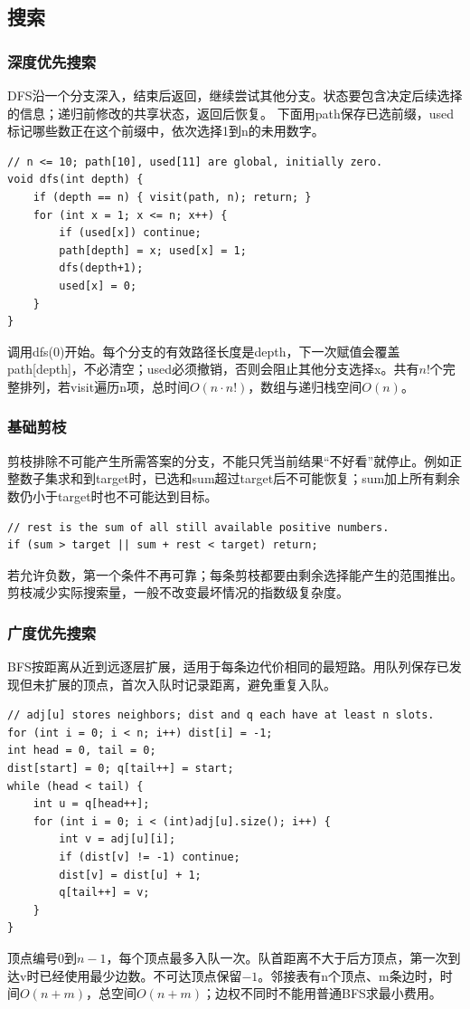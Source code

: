 \subsection{搜索}
\subsubsection{深度优先搜索}
DFS沿一个分支深入，结束后返回，继续尝试其他分支。状态要包含决定后续选择的信息；递归前修改的共享状态，返回后恢复。
下面用path保存已选前缀，used标记哪些数正在这个前缀中，依次选择1到n的未用数字。
\begin{lstlisting}
// n <= 10; path[10], used[11] are global, initially zero.
void dfs(int depth) {
    if (depth == n) { visit(path, n); return; }
    for (int x = 1; x <= n; x++) {
        if (used[x]) continue;
        path[depth] = x; used[x] = 1;
        dfs(depth+1);
        used[x] = 0;
    }
}
\end{lstlisting}
调用dfs(0)开始。每个分支的有效路径长度是depth，下一次赋值会覆盖path[depth]，不必清空；used必须撤销，否则会阻止其他分支选择x。共有$n!$个完整排列，若visit遍历n项，总时间$O(n\cdot n!)$，数组与递归栈空间$O(n)$。
\subsubsection{基础剪枝}
剪枝排除不可能产生所需答案的分支，不能只凭当前结果“不好看”就停止。例如正整数子集求和到target时，已选和sum超过target后不可能恢复；sum加上所有剩余数仍小于target时也不可能达到目标。
\begin{lstlisting}
// rest is the sum of all still available positive numbers.
if (sum > target || sum + rest < target) return;
\end{lstlisting}
若允许负数，第一个条件不再可靠；每条剪枝都要由剩余选择能产生的范围推出。剪枝减少实际搜索量，一般不改变最坏情况的指数级复杂度。
\subsubsection{广度优先搜索}
BFS按距离从近到远逐层扩展，适用于每条边代价相同的最短路。用队列保存已发现但未扩展的顶点，首次入队时记录距离，避免重复入队。
\begin{lstlisting}
// adj[u] stores neighbors; dist and q each have at least n slots.
for (int i = 0; i < n; i++) dist[i] = -1;
int head = 0, tail = 0;
dist[start] = 0; q[tail++] = start;
while (head < tail) {
    int u = q[head++];
    for (int i = 0; i < (int)adj[u].size(); i++) {
        int v = adj[u][i];
        if (dist[v] != -1) continue;
        dist[v] = dist[u] + 1;
        q[tail++] = v;
    }
}
\end{lstlisting}
顶点编号0到$n-1$，每个顶点最多入队一次。队首距离不大于后方顶点，第一次到达v时已经使用最少边数。不可达顶点保留$-1$。邻接表有n个顶点、m条边时，时间$O(n+m)$，总空间$O(n+m)$；边权不同时不能用普通BFS求最小费用。
